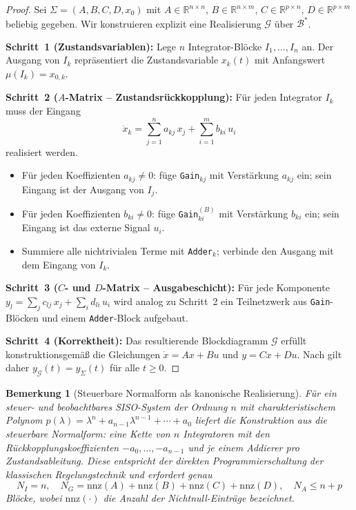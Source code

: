 ﻿\documentclass[12pt,a4paper]{article}
\newtheorem{bemerkung}[theorem]{Bemerkung}
\theoremstyle{definition}
\begin{document}
\begin{proof}
Sei $\Sigma = (A, B, C, D, x_0)$ mit $A \in \mathbb{R}^{n \times n}$,
$B \in \mathbb{R}^{n \times m}$, $C \in \mathbb{R}^{p \times n}$,
$D \in \mathbb{R}^{p \times m}$ beliebig gegeben. Wir konstruieren
explizit eine Realisierung $\mathcal{G}$ über $\mathcal{B}^*$.

\textbf{Schritt~1 (Zustandsvariablen):} Lege $n$ Integrator-Blöcke
$I_1, \ldots, I_n$ an. Der Ausgang von $I_k$ repräsentiert die
Zustandsvariable $x_k(t)$ mit Anfangswert $\mu(I_k) = x_{0,k}$.

\textbf{Schritt~2 ($A$-Matrix -- Zustandsrückkopplung):} Für jeden
Integrator $I_k$ muss der Eingang
\[
  \dot{x}_k = \sum_{j=1}^n a_{kj}\,x_j + \sum_{i=1}^m b_{ki}\,u_i
\]
realisiert werden.
\begin{itemize}[nosep]
  \item Für jeden Koeffizienten $a_{kj} \neq 0$: füge
        \texttt{Gain}$_{kj}$ mit Verstärkung $a_{kj}$ ein; sein Eingang
        ist der Ausgang von $I_j$.
  \item Für jeden Koeffizienten $b_{ki} \neq 0$: füge
        \texttt{Gain}$_{ki}^{(B)}$ mit Verstärkung $b_{ki}$ ein; sein
        Eingang ist das externe Signal $u_i$.
  \item Summiere alle nichtrivialen Terme mit \texttt{Adder}$_k$; verbinde
        den Ausgang mit dem Eingang von $I_k$.
\end{itemize}

\textbf{Schritt~3 ($C$- und $D$-Matrix -- Ausgabeschicht):} Für jede
Komponente $y_l = \sum_j c_{lj}\,x_j + \sum_i d_{li}\,u_i$ wird analog
zu Schritt~2 ein Teilnetzwerk aus \texttt{Gain}-Blöcken und einem
\texttt{Adder}-Block aufgebaut.

\textbf{Schritt~4 (Korrektheit):} Das resultierende Blockdiagramm
$\mathcal{G}$ erfüllt konstruktionsgemäß die Gleichungen
$\dot{x} = Ax + Bu$ und $y = Cx + Du$. Nach  gilt daher
$y_{\mathcal{G}}(t) = y_{\Sigma}(t)$ für alle $t \geq 0$.
\end{proof}

\begin{bemerkung}[Steuerbare Normalform als kanonische Realisierung]
\label{bem:steuerbar}
Für ein steuer- und beobachtbares SISO-System der Ordnung $n$ mit
charakteristischem Polynom
$p(\lambda) = \lambda^n + a_{n-1}\lambda^{n-1} + \cdots + a_0$
liefert die Konstruktion aus  die
\emph{steuerbare Normalform}: eine Kette von $n$ Integratoren mit den
Rückkopplungskoeffizienten $-a_0, \ldots, -a_{n-1}$ und je einem
Addierer pro Zustandsableitung. Diese entspricht der direkten
Programmierschaltung der klassischen Regelungstechnik und erfordert genau
\[
  N_I = n,\quad
  N_G = \mathrm{nnz}(A) + \mathrm{nnz}(B) + \mathrm{nnz}(C) + \mathrm{nnz}(D),\quad
  N_A \leq n + p
\]
Blöcke, wobei $\mathrm{nnz}(\cdot)$ die Anzahl der Nichtnull-Einträge bezeichnet.
\end{bemerkung}
\end{document}

